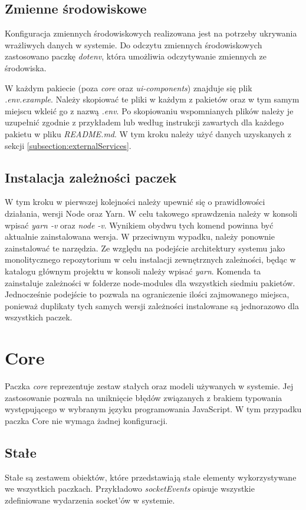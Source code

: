 \label{subsection:envs}
\subsection{Zmienne środowiskowe}
Konfiguracja zmiennych środowiskowych realizowana jest na potrzeby ukrywania wrażliwych danych w systemie.
Do odczytu zmiennych środowiskowych zastosowano paczkę \textit{dotenv}, która umożliwia odczytywanie zmiennych ze środowiska.

W każdym pakiecie (poza \textit{core} oraz \textit{ui-components}) znajduje się plik \textit{.env.example}. Należy skopiować te pliki w każdym z pakietów oraz w tym samym miejscu wkleić go z nazwą \textit{.env}. Po skopiowaniu wspomnianych plików należy je uzupełnić zgodnie z przykładem lub według instrukcji zawartych dla każdego pakietu w pliku \textit{README.md}. W tym kroku należy użyć danych uzyskanych z sekcji \ref{subsection:externalServices}.

\subsection{Instalacja zależności paczek}
W tym kroku w pierwszej kolejności należy upewnić się o prawidłowości działania, wersji Node oraz Yarn. W celu takowego sprawdzenia należy w konsoli wpisać \textit{yarn -v} oraz \textit{node -v}. Wynikiem obydwu tych komend powinna być aktualnie zainstalowana wersja. W przeciwnym wypadku, należy ponownie zainstalować te narzędzia.
Ze względu na podejście architektury systemu jako monolitycznego repozytorium w celu instalacji zewnętrznych zależności, będąc w katalogu głównym projektu w konsoli należy wpisać \textit{yarn}. Komenda ta zainstaluje zależności w folderze node-modules dla wszystkich siedmiu pakietów. Jednocześnie podejście to pozwala na ograniczenie ilości zajmowanego miejsca, ponieważ duplikaty tych samych wersji zależności instalowane są jednorazowo dla wszystkich paczek.

\section{Core}
Paczka \textit{core} reprezentuje zestaw stałych oraz modeli używanych w systemie. Jej zastosowanie pozwala na uniknięcie błędów związanych z brakiem typowania występującego w wybranym języku programowania
JavaScript. W tym przypadku paczka Core nie wymaga żadnej konfiguracji.

\subsection{Stałe}
Stałe są zestawem obiektów, które przedstawiają stałe elementy wykorzystywane we wszystkich paczkach. Przykładowo \textit{socketEvents} opisuje wszystkie zdefiniowane wydarzenia socket'ów w systemie.

